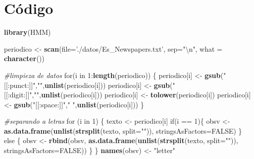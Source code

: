 \documentclass[]{article}
\newenvironment{Shaded}{\begin{snugshade}}{\end{snugshade}}
\newcommand{\KeywordTok}[1]{\textcolor[rgb]{0.13,0.29,0.53}{\textbf{{#1}}}}
\newcommand{\DataTypeTok}[1]{\textcolor[rgb]{0.13,0.29,0.53}{{#1}}}
\newcommand{\DecValTok}[1]{\textcolor[rgb]{0.00,0.00,0.81}{{#1}}}
\newcommand{\CharTok}[1]{\textcolor[rgb]{0.31,0.60,0.02}{{#1}}}
\newcommand{\StringTok}[1]{\textcolor[rgb]{0.31,0.60,0.02}{{#1}}}
\newcommand{\CommentTok}[1]{\textcolor[rgb]{0.56,0.35,0.01}{\textit{{#1}}}}
\newcommand{\OtherTok}[1]{\textcolor[rgb]{0.56,0.35,0.01}{{#1}}}
\newcommand{\NormalTok}[1]{{#1}}
\begin{document}
\pagebreak

\section{Código}\label{codigo}

\begin{Shaded}
\begin{Highlighting}[]
\KeywordTok{library}\NormalTok{(HMM)}

\NormalTok{periodico <-}\StringTok{ }\KeywordTok{scan}\NormalTok{(}\DataTypeTok{file=}\StringTok{'./datos/Es_Newspapers.txt'}\NormalTok{, }\DataTypeTok{sep=}\StringTok{"}\CharTok{\textbackslash{}n}\StringTok{"}\NormalTok{, }\DataTypeTok{what =} \KeywordTok{character}\NormalTok{())}

\CommentTok{#limpieza de datos}
\NormalTok{for(i in }\DecValTok{1}\NormalTok{:}\KeywordTok{length}\NormalTok{(periodico)) \{}
  \NormalTok{periodico[i] <-}\StringTok{ }\KeywordTok{gsub}\NormalTok{(}\StringTok{"[[:punct:]]"}\NormalTok{,}\StringTok{""}\NormalTok{,}\KeywordTok{unlist}\NormalTok{(periodico[i]))}
  \NormalTok{periodico[i] <-}\StringTok{ }\KeywordTok{gsub}\NormalTok{(}\StringTok{"[[:digit:]]"}\NormalTok{,}\StringTok{""}\NormalTok{,}\KeywordTok{unlist}\NormalTok{(periodico[i]))}
  \NormalTok{periodico[i] <-}\StringTok{ }\KeywordTok{tolower}\NormalTok{(periodico[i])}
  \NormalTok{periodico[i] <-}\StringTok{ }\KeywordTok{gsub}\NormalTok{(}\StringTok{"[[:space:]]"}\NormalTok{,}\StringTok{" "}\NormalTok{,}\KeywordTok{unlist}\NormalTok{(periodico[i]))}
\NormalTok{\}}


\CommentTok{#separando a letras}
\NormalTok{for (i in }\DecValTok{1}\NormalTok{) \{}
  \NormalTok{texto <-}\StringTok{ }\NormalTok{periodico[i]}
  \NormalTok{if(i ==}\StringTok{ }\DecValTok{1}\NormalTok{)\{}
    \NormalTok{obsv <-}\StringTok{ }\KeywordTok{as.data.frame}\NormalTok{(}\KeywordTok{unlist}\NormalTok{(}\KeywordTok{strsplit}\NormalTok{(texto, }\DataTypeTok{split=}\StringTok{""}\NormalTok{)), }\DataTypeTok{stringsAsFactors=}\OtherTok{FALSE}\NormalTok{)}
  \NormalTok{\} else \{}
    \NormalTok{obsv <-}\StringTok{ }\KeywordTok{rbind}\NormalTok{(obsv, }\KeywordTok{as.data.frame}\NormalTok{(}\KeywordTok{unlist}\NormalTok{(}\KeywordTok{strsplit}\NormalTok{(texto, }\DataTypeTok{split=}\StringTok{""}\NormalTok{)), }\DataTypeTok{stringsAsFactors=}\OtherTok{FALSE}\NormalTok{))}
  \NormalTok{\}}
\NormalTok{\}}
\KeywordTok{names}\NormalTok{(obsv) <-}\StringTok{ "letter"}



\end{Highlighting}
\end{Shaded}
\end{document}
